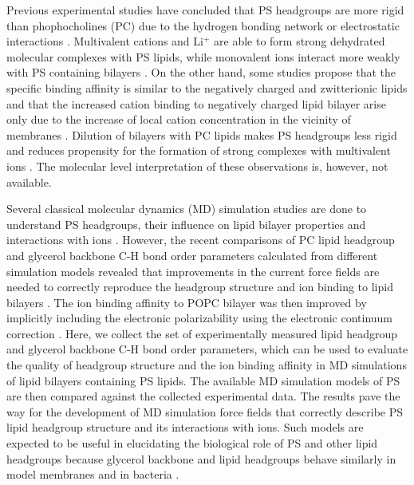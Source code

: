 \documentclass[aps,prl,superscriptaddress,twocolumn]{revtex4}
\begin{document}
Previous experimental studies have concluded that
PS headgroups are more rigid than phophocholines (PC)
due to the hydrogen bonding network or
electrostatic interactions \cite{browning80,buldt81}.
Multivalent cations and Li$^+$ are able to form strong
dehydrated molecular complexes with PS lipids,
while monovalent ions interact more weakly with PS
containing bilayers \cite{hauser77,kurland79,eisenberg79,hauser83,dluhy83,hauser85,feigenson86,mattai89,roux90,roux91,boettcher11}.
On the other hand, some studies propose that the specific binding
affinity is similar to the negatively charged and zwitterionic lipids and that
the increased cation binding to negatively charged lipid bilayer arise only due
to the increase of local cation concentration in the vicinity of membranes \cite{seelig90,sinn06}.
Dilution of bilayers with PC lipids makes PS headgroups
less rigid and reduces propensity for the formation of
strong complexes with multivalent ions \cite{browning80,buldt81,roux90,roux91}.
The molecular level interpretation of these observations is,
however, not available.

Several classical molecular dynamics (MD) simulation studies are done
to understand PS headgroups, their influence on lipid bilayer properties and
interactions with ions \cite{cascales96,pandit02,mukhopadhyay04,pedersen06,vernier09,boettcher11,molina12,jurkiewicz12,venable13,pan14,vangaveti14,melcrova16}.
However, the recent comparisons of PC lipid headgroup and glycerol backbone
C-H bond order parameters calculated from different simulation models
revealed that improvements in the current force fields are needed
to correctly reproduce the headgroup structure and ion binding to
lipid bilayers \cite{botan15,catte16,ollila16}. The ion binding affinity
to POPC bilayer was then improved by implicitly including the electronic
polarizability using the electronic continuum correction \cite{melcr18}.
Here, we collect the set of experimentally measured lipid headgroup and
glycerol backbone C-H bond order parameters, which can be used to
evaluate the quality of headgroup structure and the ion binding affinity
in MD simulations of lipid bilayers containing PS lipids. 
The available MD simulation models of PS are then compared against
the collected experimental data. The results pave the way for the
development of MD simulation force fields that correctly describe
PS lipid headgroup structure and its interactions with ions.
Such models are expected to be useful in elucidating the biological
role of PS and other lipid headgroups because glycerol backbone and
lipid headgroups behave similarly in model membranes and in
bacteria \cite{gally81,scherer87,seelig90}.
\end{document}
